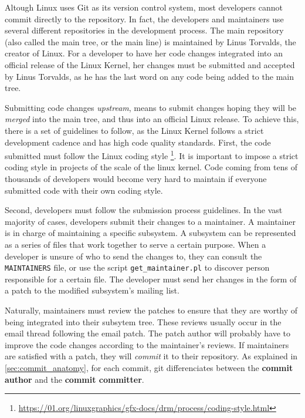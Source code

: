 \label{sec:Introduction}  
Altough Linux uses Git as its version control system, most developers cannot commit directly to the repository. In fact, the developers and maintainers use several different repositories in the development process. The main repository (also called the main tree, or the main line) is maintained by Linus Torvalds, the creator of Linux. For a developer to have her code changes integrated into an official release of the Linux Kernel, her changes must be submitted and accepted by Linus Torvalds, as he has the last word on any code being added to the main tree. 

Submitting code changes \textit{upstream}, means to submit changes hoping they will be \textit{merged} into the main tree, and thus into an official Linux release. To achieve this, there is a set of guidelines to follow, as the Linux Kernel follows a strict development cadence and has high code quality standards. First, the code submitted must follow the Linux coding style \footnote{\url{https://01.org/linuxgraphics/gfx-docs/drm/process/coding-style.html}}. It is important to impose a strict coding style in projects of the scale of the linux kernel. Code coming from tens of thousands of developers would become very hard to maintain if everyone submitted code with their own coding style. 

Second, developers must follow the submission process guidelines. In the vast majority of cases, developers submit their changes to a maintainer. A maintainer is in charge of maintaining a specific subsystem. A subsystem can be represented as a series of files that work together to serve a certain purpose. When a developer is unsure of who to send the changes to, they can consult the \texttt{MAINTAINERS} file, or use the script \texttt{get\_maintainer.pl} to discover person responsible for a certain file. The developer must send her changes in the form of a patch to the modified subsystem's mailing list. 

Naturally, maintainers must review the patches to ensure that they are worthy of being integrated into their subsytem tree. These reviews usually occur in the email thread following the email patch. The patch author will probably have to improve the code changes according to the maintainer's reviews. If maintainers are satisfied with a patch, they will \textit{commit} it to their repository. As explained in \autoref{sec:commit_anatomy}, for each commit, git differenciates between the \textbf{commit author} and the \textbf{commit committer}. 

